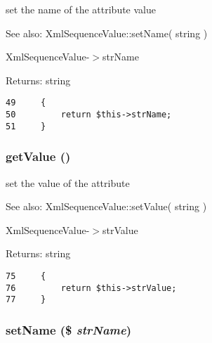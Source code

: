set the name of the attribute value

\begin{Desc}
\item[See also:]XmlSequenceValue::setName( string ) 

XmlSequenceValue-$>$strName \end{Desc}
\begin{Desc}
\item[Returns:]string \end{Desc}


\begin{Code}\begin{verbatim}49     {
50         return $this->strName;
51     }
\end{verbatim}
\end{Code}


\hypertarget{class_xml_sequence_value_c0bc18784b182c89fcfd276625aef435}{
\subsubsection[{getValue}]{\setlength{\rightskip}{0pt plus 5cm}getValue ()}}
\label{class_xml_sequence_value_c0bc18784b182c89fcfd276625aef435}


set the value of the attribute

\begin{Desc}
\item[See also:]XmlSequenceValue::setValue( string ) 

XmlSequenceValue-$>$strValue \end{Desc}
\begin{Desc}
\item[Returns:]string \end{Desc}


\begin{Code}\begin{verbatim}75     {
76         return $this->strValue;
77     }
\end{verbatim}
\end{Code}


\hypertarget{class_xml_sequence_value_c05d9184d52b7a34210a801767bef213}{
\subsubsection[{setName}]{\setlength{\rightskip}{0pt plus 5cm}setName (\$ {\em strName})}}
\label{class_xml_sequence_value_c05d9184d52b7a34210a801767bef213}


